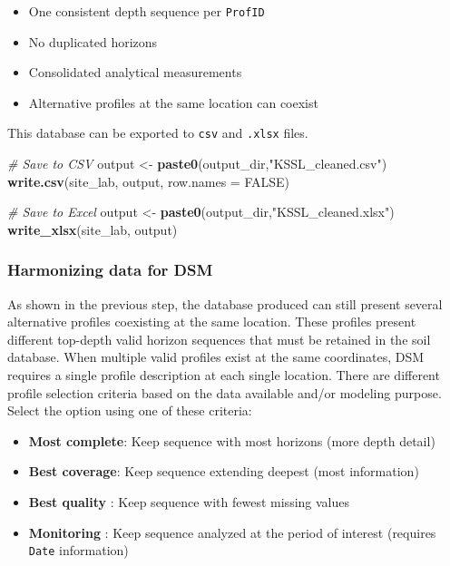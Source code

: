 \documentclass[
  10pt,
  b5paper,
  oneside]{book}
\newenvironment{Shaded}{\begin{snugshade}}{\end{snugshade}}
\newcommand{\AttributeTok}[1]{\textcolor[rgb]{0.13,0.29,0.53}{#1}}
\newcommand{\CommentTok}[1]{\textcolor[rgb]{0.56,0.35,0.01}{\textit{#1}}}
\newcommand{\ConstantTok}[1]{\textcolor[rgb]{0.56,0.35,0.01}{#1}}
\newcommand{\FunctionTok}[1]{\textcolor[rgb]{0.13,0.29,0.53}{\textbf{#1}}}
\newcommand{\NormalTok}[1]{#1}
\newcommand{\OtherTok}[1]{\textcolor[rgb]{0.56,0.35,0.01}{#1}}
\newcommand{\StringTok}[1]{\textcolor[rgb]{0.31,0.60,0.02}{#1}}
\providecommand{\tightlist}{%
  \setlength{\itemsep}{0pt}\setlength{\parskip}{0pt}}
\begin{document}
\begin{itemize}
\tightlist
\item
  One consistent depth sequence per \texttt{ProfID}\\
\item
  No duplicated horizons
\item
  Consolidated analytical measurements
\item
  Alternative profiles at the same location can coexist
\end{itemize}

This database can be exported to \texttt{csv} and \texttt{.xlsx} files.

\begin{Shaded}
\begin{Highlighting}[]
\CommentTok{\# Save to CSV}
\NormalTok{output }\OtherTok{\textless{}{-}} \FunctionTok{paste0}\NormalTok{(output\_dir,}\StringTok{"KSSL\_cleaned.csv"}\NormalTok{)}
\FunctionTok{write.csv}\NormalTok{(site\_lab, output, }\AttributeTok{row.names =} \ConstantTok{FALSE}\NormalTok{)}

\CommentTok{\# Save to Excel}
\NormalTok{output }\OtherTok{\textless{}{-}} \FunctionTok{paste0}\NormalTok{(output\_dir,}\StringTok{"KSSL\_cleaned.xlsx"}\NormalTok{)}
\FunctionTok{write\_xlsx}\NormalTok{(site\_lab, output)}
\end{Highlighting}
\end{Shaded}

\subsubsection{Harmonizing data for DSM}\label{harmonizing-data-for-dsm}

As shown in the previous step, the database produced can still present several alternative profiles coexisting at the same location. These profiles present different top-depth valid horizon sequences that must be retained in the soil database. When multiple valid profiles exist at the same coordinates, DSM requires a single profile description at each single location. There are different profile selection criteria based on the data available and/or modeling purpose. Select the option using one of these criteria:

\begin{itemize}
\tightlist
\item
  \textbf{Most complete}: Keep sequence with most horizons (more depth detail)
\item
  \textbf{Best coverage}: Keep sequence extending deepest (most information)
\item
  \textbf{Best quality} : Keep sequence with fewest missing values
\item
  \textbf{Monitoring} : Keep sequence analyzed at the period of interest (requires \texttt{Date} information)
\end{itemize}
\end{document}
